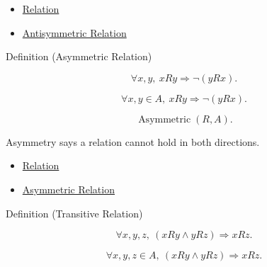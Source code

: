\begin{dependencies}
\begin{itemize}
  \item \hyperref[def:relation]{Relation}
  \item \hyperref[def:antisymmetric]{Antisymmetric Relation}
\end{itemize}
\end{dependencies}

\begin{definitionbox}{Definition (Asymmetric Relation)}
\begin{definition}
\label{def:asymmetric-relation}
\[
\forall x,y,\ xRy \Longrightarrow \neg(yRx).
\]
\end{definition}
\end{definitionbox}

\begin{remark*}
\[
\forall x,y\in A,\ xRy \Longrightarrow \neg(yRx).
\]
\end{remark*}

\begin{remark*}
\[
\operatorname{Asymmetric}(R,A).
\]
\end{remark*}

\begin{remark*}[Interpretation]
Asymmetry says a relation cannot hold in both directions.
\end{remark*}

\begin{dependencies}
\begin{itemize}
  \item \hyperref[def:relation]{Relation}
  \item \hyperref[def:asymmetric]{Asymmetric Relation}
\end{itemize}
\end{dependencies}

\begin{definitionbox}{Definition (Transitive Relation)}
\begin{definition}
\label{def:transitive-relation}
\[
\forall x,y,z,\ (xRy\land yRz)\Longrightarrow xRz.
\]
\end{definition}
\end{definitionbox}

\begin{remark*}
\[
\forall x,y,z\in A,\ (xRy\land yRz)\Longrightarrow xRz.
\]
\end{remark*}

